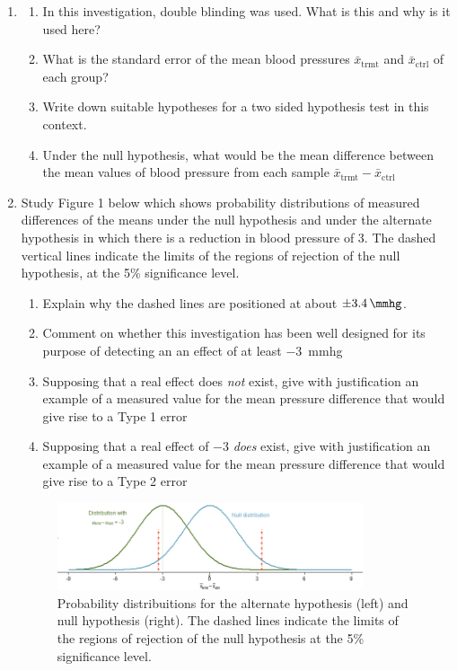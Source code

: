 \documentclass[a4paper,12pt,fleqn]{article}
\begin{document}
\begin{enumerate}[label=\alph*)]
\item	
	\begin{enumerate}[label=\roman*)]
	\item In this investigation, double blinding was used. What is this and why is it used here?
	\item What is the standard error of the mean blood pressures $\bar{x}_\text{trmt}$ and $\bar{x}_\text{ctrl}$ of each group?
	\item Write down suitable hypotheses for a two sided hypothesis test in this context.
	\item Under the null hypothesis, what would be the mean difference between the mean values of blood pressure from each sample $\bar{x}_\text{trmt}-\bar{x}_\text{ctrl}$
	\end{enumerate}
	
	\item Study Figure 1 below which shows probability distributions of measured differences of the means under the null hypothesis and under the alternate hypothesis in which there is a reduction in blood pressure of \SI{3}{\mmhg}. The dashed vertical lines indicate the limits of the regions of rejection of the null hypothesis, at the 5\% significance level. 
	
	\begin{enumerate}[label=\roman*)]
	\item Explain why the dashed lines are positioned at about $ \pm\SI{3.4}{\mmhg}$.
	\item Comment on whether this investigation has been well designed for its purpose of detecting an an effect of at least \SI{-3}{mmhg}
	\item  Supposing that a real effect does \emph{not} exist, give with justification  an example of a measured value for the mean pressure difference that would give rise to a Type 1 error
	\item  Supposing that a real effect of \SI{-3}{\mmhg} \emph{does} exist, give with justification  an example of a measured value for the mean pressure difference that would give rise to a Type 2 error

	\end{enumerate}
	\begin{figure}[h]
	\centering
	\includegraphics[width=0.85\textwidth]{power_null_C_0_1_7_with_alt_at_3.png}
	\caption{Probability distribuitions for the alternate hypothesis (left) and null hypothesis (right). The dashed lines indicate the limits of the regions of rejection of the null hypothesis at the 5\% significance level.}
	\label{figure:q3b}
	\end{figure}
	

\end{enumerate}
\end{document}

